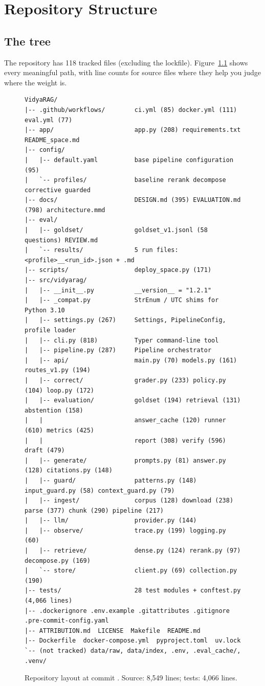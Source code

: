 \chapter{Repository Structure}
\label{ch:repo}

\section{The tree}

The repository has 118 tracked files (excluding the lockfile). Figure~\ref{fig:tree} shows every meaningful path, with line counts for source files where they help you judge where the weight is.

\begin{figure}[htbp]
\begin{lstlisting}[language={},numbers=none,basicstyle=\ttfamily\scriptsize,frame=single]
VidyaRAG/
|-- .github/workflows/        ci.yml (85) docker.yml (111) eval.yml (77)
|-- app/                      app.py (208) requirements.txt README_space.md
|-- config/
|   |-- default.yaml          base pipeline configuration (95)
|   `-- profiles/             baseline rerank decompose corrective guarded
|-- docs/                     DESIGN.md (395) EVALUATION.md (798) architecture.mmd
|-- eval/
|   |-- goldset/              goldset_v1.jsonl (58 questions) REVIEW.md
|   `-- results/              5 run files: <profile>__<run_id>.json + .md
|-- scripts/                  deploy_space.py (171)
|-- src/vidyarag/
|   |-- __init__.py           __version__ = "1.2.1"
|   |-- _compat.py            StrEnum / UTC shims for Python 3.10
|   |-- settings.py (267)     Settings, PipelineConfig, profile loader
|   |-- cli.py (818)          Typer command-line tool
|   |-- pipeline.py (287)     Pipeline orchestrator
|   |-- api/                  main.py (70) models.py (161) routes_v1.py (194)
|   |-- correct/              grader.py (233) policy.py (104) loop.py (172)
|   |-- evaluation/           goldset (194) retrieval (131) abstention (158)
|   |                         answer_cache (120) runner (610) metrics (425)
|   |                         report (308) verify (596) draft (479)
|   |-- generate/             prompts.py (81) answer.py (128) citations.py (148)
|   |-- guard/                patterns.py (148) input_guard.py (58) context_guard.py (79)
|   |-- ingest/               corpus (128) download (238) parse (377) chunk (290) pipeline (217)
|   |-- llm/                  provider.py (144)
|   |-- observe/              trace.py (199) logging.py (60)
|   |-- retrieve/             dense.py (124) rerank.py (97) decompose.py (169)
|   `-- store/                client.py (69) collection.py (190)
|-- tests/                    28 test modules + conftest.py (4,066 lines)
|-- .dockerignore .env.example .gitattributes .gitignore .pre-commit-config.yaml
|-- ATTRIBUTION.md  LICENSE  Makefile  README.md
|-- Dockerfile  docker-compose.yml  pyproject.toml  uv.lock
`-- (not tracked) data/raw, data/index, .env, .eval_cache/, .venv/
\end{lstlisting}
\caption{Repository layout at commit . Source: 8,549 lines; tests: 4,066 lines.}
\label{fig:tree}
\end{figure}

